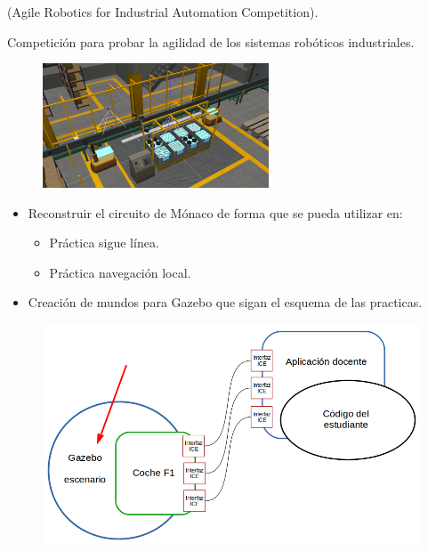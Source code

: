 \documentclass[notes,slidesec,a4]{seminar}
\begin{document}
\begin{hslide}
		\begin{center}(Agile Robotics for Industrial Automation Competition).	\end{center}
		Competición para probar la agilidad de los sistemas robóticos industriales.
	\begin{center}
		\begin{figure}
			\includegraphics[width=0.6\textwidth]{ariac01.png}
		\end{figure}
	\end{center}
\end{hslide}


\begin{hslide}
	\begin{itemize}
		\item Reconstruir el circuito de Mónaco de forma que se pueda utilizar en:
		\begin{itemize}
			\item Práctica sigue línea.
			\item Práctica navegación local.
		\end{itemize}
		\item Creación de mundos para Gazebo que sigan el esquema de las practicas.
	\end{itemize}
\end{hslide}

\begin{hslide}
	\begin{center}
		\begin{figure}
			\includegraphics[width=\textwidth]{graficof1.png}
		\end{figure}
	\end{center}
\end{hslide}
\end{document}

